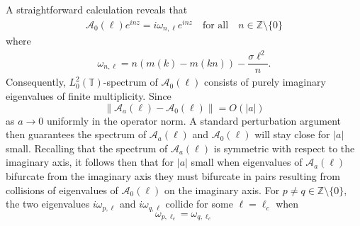 \documentclass[12pt]{amsart}    %
\newcommand{\C}{\mathbb{C}}
\newcommand{\calM}{\mathcal{M}}
\numberwithin{equation}{section}
\begin{document}
A straightforward calculation reveals that 
\begin{align}\label{E:spec}
    \mathcal A_0(\ell)e^{inz} = i\omega_{n,\ell}e^{inz}\quad \text{for all}\quad n \in \mathbb{Z}\setminus \{0\}
\end{align}
where
\begin{align}\label{E:omega}
    \omega_{n,\ell} = n(m(k)-m(kn))-\dfrac{\sigma \ell^2}{n}.
\end{align}
Consequently, $L^2_0(\mathbb{T})$-spectrum of $\mathcal A_0(\ell)$ consists of purely imaginary eigenvalues of finite multiplicity.
Since
\[
\|\mathcal A_a(\ell) - \mathcal A_0(\ell)\|= O(|a|)
\]as $a \to 0$ uniformly in the operator norm. A standard perturbation argument then guarantees the spectrum of $\mathcal A_a(\ell)$ and $\mathcal A_0(\ell)$ will stay close for $|a|$ small. 
Recalling that the spectrum of $\mathcal A_a(\ell)$ is symmetric with respect to the imaginary axis, it follows then that for $|a|$ small when eigenvalues of $\mathcal A_a(\ell)$ bifurcate from the imaginary axis they must bifurcate in pairs resulting from collisions of eigenvalues of $\mathcal A_0(\ell)$ on the imaginary axis. For $p\neq q\in\mathbb{Z}\setminus \{0\}$, the two eigenvalues $i\omega_{p,\ell}$ and $i\omega_{q,\ell}$ collide for some $\ell=\ell_c$ when
\begin{equation}
    \omega_{p,\ell_c}=\omega_{q,\ell_c}
\end{equation}
\end{document}
